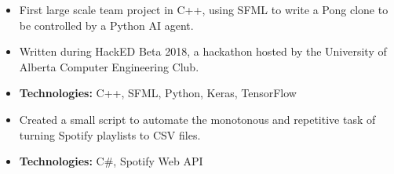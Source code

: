 \documentclass[10pt,a4paper,ragged2e,academicons]{altacv}
\begin{document}
\begin{itemize}
  \item First large scale team project in C++, using SFML to write a Pong clone to be controlled by a Python AI agent.
  \item Written during HackED Beta 2018, a hackathon hosted by the University of Alberta Computer Engineering Club.
  \item \textbf{Technologies:} C++, SFML, Python, Keras, TensorFlow
\end{itemize}
\divider\small

\begin{itemize}
  \item Created a small script to automate the monotonous and repetitive task of turning Spotify playlists to CSV files.
  \item \textbf{Technologies:} C\#, Spotify Web API
\end{itemize}
\divider\small

\clearpage
\nocite{*}
\end{document}
